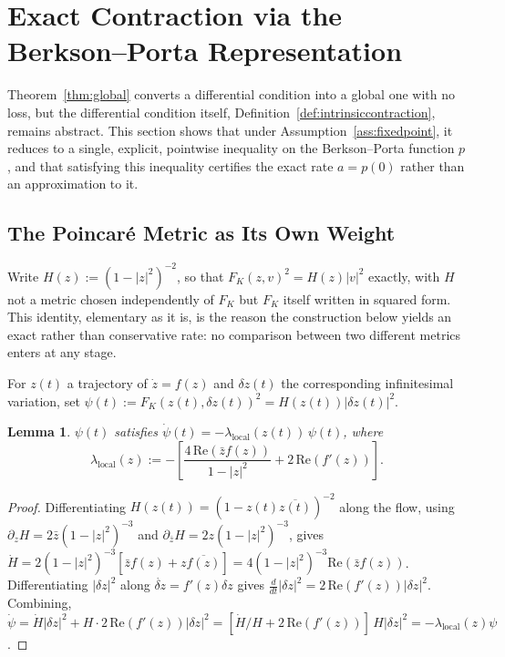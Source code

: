 \documentclass[pdflatex,sn-mathphys-num]{sn-jnl}%
\theoremstyle{thmstyleone}%
\theoremstyle{thmstyletwo}%
\theoremstyle{thmstylethree}%
\newtheorem{lemma}{Lemma} %
\begin{document}
\section{Exact Contraction via the Berkson--Porta Representation}
\label{sec:reduction}

Theorem~\ref{thm:global} converts a differential condition into a global one with no loss, but the differential condition itself, Definition~\ref{def:intrinsiccontraction}, remains abstract. This section shows that under Assumption~\ref{ass:fixedpoint}, it reduces to a single, explicit, pointwise inequality on the Berkson--Porta function $p$, and that satisfying this inequality certifies the exact rate $a=p(0)$ rather than an approximation to it.

\subsection{The Poincar\'e Metric as Its Own Weight}

Write $H(z):=(1-|z|^2)^{-2}$, so that $F_K(z,v)^2=H(z)|v|^2$ exactly, with $H$ not a metric chosen independently of $F_K$ but $F_K$ itself written in squared form. This identity, elementary as it is, is the reason the construction below yields an exact rather than conservative rate: no comparison between two different metrics enters at any stage.

For $z(t)$ a trajectory of $\dot z=f(z)$ and $\delta z(t)$ the corresponding infinitesimal variation, set $\psi(t):=F_K(z(t),\delta z(t))^2=H(z(t))|\delta z(t)|^2$.

\begin{lemma}
\label{lem:localrate}
$\psi(t)$ satisfies $\dot\psi(t)=-\lambda_{\mathrm{local}}(z(t))\,\psi(t)$, where
\begin{equation}
\lambda_{\mathrm{local}}(z) := -\left[\frac{4\,\mathrm{Re}(\bar zf(z))}{1-|z|^2} + 2\,\mathrm{Re}(f'(z))\right]. \label{eq:lambdalocal}
\end{equation}
\end{lemma}

\begin{proof}
Differentiating $H(z(t))=(1-z(t)\overline{z(t)})^{-2}$ along the flow, using $\partial_zH=2\bar z(1-|z|^2)^{-3}$ and $\partial_{\bar z}H=2z(1-|z|^2)^{-3}$, gives $\dot H=2(1-|z|^2)^{-3}[\bar zf(z)+z\overline{f(z)}]=4(1-|z|^2)^{-3}\mathrm{Re}(\bar zf(z))$. Differentiating $|\delta z|^2$ along $\dot{\delta z}=f'(z)\delta z$ gives $\frac{d}{dt}|\delta z|^2=2\,\mathrm{Re}(f'(z))|\delta z|^2$. Combining, $\dot\psi=\dot H|\delta z|^2+H\cdot2\,\mathrm{Re}(f'(z))|\delta z|^2=[\dot H/H+2\,\mathrm{Re}(f'(z))]\,H|\delta z|^2=-\lambda_{\mathrm{local}}(z)\psi$.
\end{proof}
\end{document}
